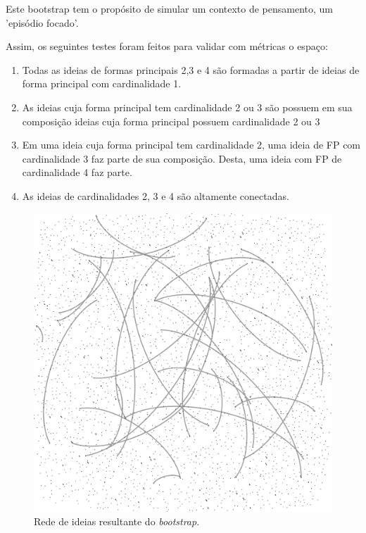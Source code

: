 \documentclass[a4paper,12pt,titlepage]{article}
\begin{document}
Este bootstrap tem o propósito de simular um contexto de pensamento, um 'episódio focado'.

Assim, os seguintes testes foram feitos para validar com métricas o espaço:

\begin{enumerate}
    \item Todas as ideias de formas principais 2,3 e 4 são formadas a partir de ideias de forma principal com cardinalidade 1.
    \item As ideias cuja forma principal tem cardinalidade 2 ou 3 são possuem em sua composição ideias cuja forma principal possuem cardinalidade 2 ou 3
    \item Em uma ideia cuja forma principal tem cardinalidade 2, uma ideia de FP com cardinalidade 3 faz parte de sua composição. Desta, uma ideia com FP de cardinalidade 4 faz parte.
    \item As ideias de cardinalidades 2, 3 e 4 são altamente conectadas.
\end{enumerate}

\begin{figure}[h!]
    \begin{center}
        \includegraphics[scale=.3]{figs/boot1}
        \caption{Rede de ideias resultante do \emph{bootstrap}.}
        \label{fig:boot}
    \end{center}
\end{figure}
\end{document}
